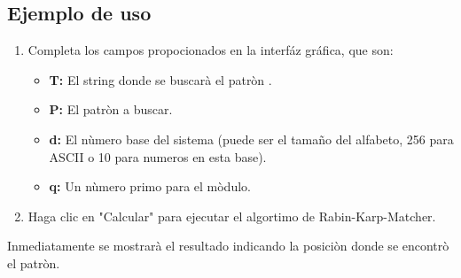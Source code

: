\documentclass[a4paper]{article}
\begin{document}
\subsection{Ejemplo de uso}
\begin{enumerate}
    \item Completa los campos propocionados en la interfáz gráfica, que son:
    \begin{itemize}
        \item \textbf{T:} El string donde se buscarà el patròn .
        \item \textbf{P:} El patròn a buscar.
        \item \textbf{d:} El nùmero base del sistema (puede ser el tamaño del alfabeto, 256 para ASCII o 10 para numeros en esta base).
        \item \textbf{q:} Un nùmero primo para el mòdulo.
    \end{itemize}
    \item Haga clic en "Calcular" para ejecutar el algortimo de Rabin-Karp-Matcher.
\end{enumerate}
 Inmediatamente se mostrarà el resultado indicando la posiciòn donde se encontrò el patròn. 
\end{document}
